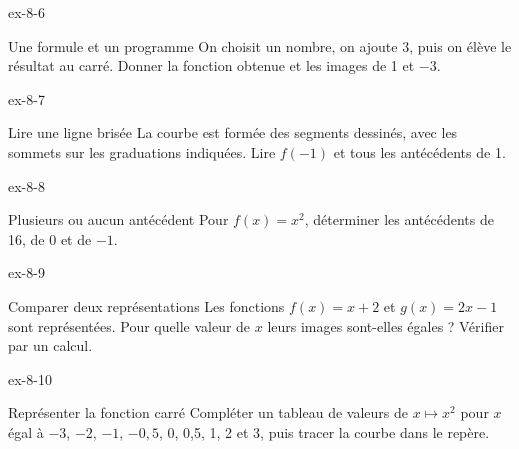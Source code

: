 \clearpage{}
\begin{blocLivre}{ex-8-6}\begin{exercice}[2]{Une formule et un programme}
On choisit un nombre, on ajoute 3, puis on élève le résultat au carré. Donner la fonction obtenue et les images de 1 et $-3$.
\end{exercice}\end{blocLivre}
\begin{blocLivre}{ex-8-7}\begin{exercice}[2]{Lire une ligne brisée}
La courbe est formée des segments dessinés, avec les sommets sur les graduations indiquées. Lire $f(-1)$ et tous les antécédents de 1.
\label{fig-ex-8-7}
\end{exercice}\end{blocLivre}
\begin{blocLivre}{ex-8-8}\begin{exercice}[2]{Plusieurs ou aucun antécédent}
Pour $f(x)=x^2$, déterminer les antécédents de 16, de 0 et de $-1$.
\label{fig-ex-8-8}
\end{exercice}\end{blocLivre}
\begin{blocLivre}{ex-8-9}\begin{exercice}[2]{Comparer deux représentations}
Les fonctions $f(x)=x+2$ et $g(x)=2x-1$ sont représentées. Pour quelle valeur de $x$ leurs images sont-elles égales ? Vérifier par un calcul.
\label{fig-ex-8-9}
\end{exercice}\end{blocLivre}
\begin{blocLivre}{ex-8-10}\begin{exercice}[2]{Représenter la fonction carré}
Compléter un tableau de valeurs de $x\mapsto x^2$ pour $x$ égal à $-3$, $-2$, $-1$, $-0{,}5$, 0, 0,5, 1, 2 et 3, puis tracer la courbe dans le repère.
\label{fig-ex-8-10}
\end{exercice}\end{blocLivre}

